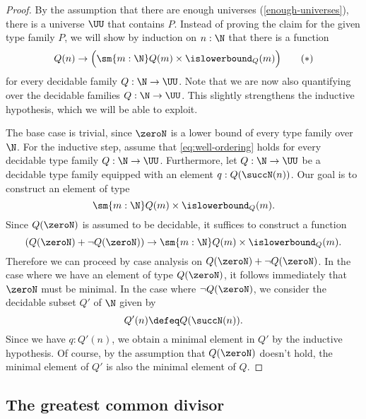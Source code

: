 \begin{proof}
  By the assumption that there are enough universes (\cref{enough-universes}), there is a universe $\UU$ that contains $P$. Instead of proving the claim for the given type family $P$, we will show by induction on $n:\N$ that there is a function
  \begin{equation*}\label{eq:well-ordering}
    Q(n)\to \Big(\sm{m:\N}Q(m)\times\islowerbound_Q(m)\Big)\tag{\textasteriskcentered}
  \end{equation*}
  for every decidable family $Q:\N\to\UU$. Note that we are now also quantifying over the decidable families $Q:\N\to\UU$. This slightly strengthens the inductive hypothesis, which we will be able to exploit.

  The base case is trivial, since $\zeroN$ is a lower bound of every type family over $\N$. For the inductive step, assume that \cref{eq:well-ordering} holds for every decidable type family $Q:\N\to \UU$. Furthermore, let $Q:\N\to\UU$ be a decidable type family equipped with an element $q:Q(\succN(n))$. Our goal is to construct an element of type
  \begin{equation*}
    \sm{m:\N}Q(m)\times\islowerbound_Q(m).
  \end{equation*}
  Since $Q(\zeroN)$ is assumed to be decidable, it suffices to construct a function
  \begin{equation*}
    (Q(\zeroN)+\neg Q(\zeroN))\to \sm{m:\N}Q(m)\times\islowerbound_Q(m).
  \end{equation*}
  Therefore we can proceed by case analysis on $Q(\zeroN)+\neg Q(\zeroN)$. In the case where we have an element of type $Q(\zeroN)$, it follows immediately that $\zeroN$ must be minimal. In the case where $\neg Q(\zeroN)$, we consider the decidable subset $Q'$ of $\N$ given by
  \begin{equation*}
    Q'(n)\defeq Q(\succN(n)).
  \end{equation*}
  Since we have $q:Q'(n)$, we obtain a minimal element in $Q'$ by the inductive hypothesis. Of course, by the assumption that $Q(\zeroN)$ doesn't hold, the minimal element of $Q'$ is also the minimal element of $Q$.
\end{proof}

\subsection{The greatest common divisor}

